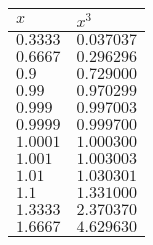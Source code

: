 \documentclass{standalone}
\begin{document}
\begin{tabular}{l | l}
  \(x\) & \(x^{3}\) \\
  \hline
  \(0.3333\) & \(0.037037\)\\
  \(0.6667\) & \(0.296296\)\\
  \(0.9\) & \(0.729000\)\\
  \(0.99\) & \(0.970299\)\\
  \(0.999\) & \(0.997003\)\\
  \(0.9999\) & \(0.999700\)\\
  \(1.0001\) & \(1.000300\)\\
  \(1.001\) & \(1.003003\)\\
  \(1.01\) & \(1.030301\)\\
  \(1.1\) & \(1.331000\)\\
  \(1.3333\) & \(2.370370\)\\
  \(1.6667\) & \(4.629630\)\\
\end{tabular}
\end{document}
